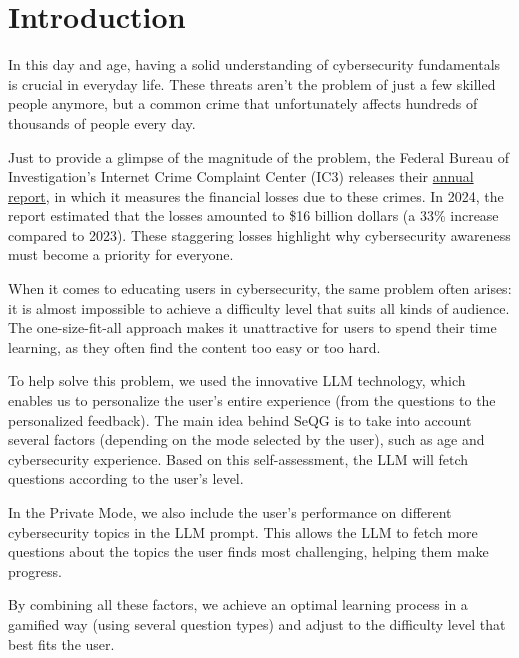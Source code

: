 \chapter{Introduction}
In this day and age, having a solid understanding of cybersecurity fundamentals is crucial in 
everyday life. These threats aren't the problem of just a few skilled people anymore, but a common crime that unfortunately 
affects hundreds of thousands of people every day.

Just to provide a glimpse of the magnitude of the problem, the Federal Bureau of Investigation's Internet Crime Complaint Center (IC3) 
releases their \href{ https://www.ic3.gov/AnnualReport/Reports/2024_IC3Report.pdf}{annual report}, in which it measures the financial losses 
due to these crimes. In 2024, the report estimated that the losses amounted to \$16 billion dollars 
(a 33\% increase compared to 2023). These staggering losses highlight why cybersecurity awareness must become a priority for everyone.

When it comes to educating users in cybersecurity, the same problem often arises: it is almost 
impossible to achieve a difficulty level that suits all kinds of audience. The one-size-fit-all approach 
makes it unattractive for users to spend their time learning, as they often find the content too easy or too hard.

To help solve this problem, we used the innovative LLM technology, which enables us to personalize the user's entire experience
(from the questions to the personalized feedback). The main idea behind SeQG is to take into account several factors (depending on 
the mode selected by the user), such as age and cybersecurity experience. Based on this self-assessment, the LLM will fetch 
questions according to the user's level.

In the Private Mode, we also include the user's performance on different cybersecurity topics in the LLM prompt. This allows
the LLM to fetch more questions about the topics the user finds most challenging, helping them make progress.

By combining all these factors, we achieve an optimal learning process in a gamified way (using several question types) and 
adjust to the difficulty level that best fits the user.
